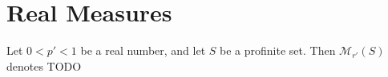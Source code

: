 \section{Real Measures}

\begin{definition}
  \label{real-measures}
  Let $0 < p' < 1$ be a real number, and let $S$ be a profinite set.
  Then $\mathcal M_{r'}(S)$ denotes TODO
\end{definition}
